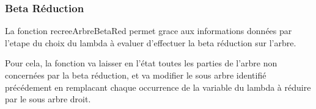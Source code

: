 \documentclass[a4paper,11pt,titlepage]{article}
\begin{document}
\subsubsection{Beta Réduction}

  La fonction recreeArbreBetaRed permet grace aux informations données par l'etape du choix du lambda à evaluer d'effectuer la
beta réduction sur l'arbre.

  Pour cela, la fonction va laisser en l'état toutes les parties de l'arbre non concernées par la beta réduction, et va modifier
le sous arbre identifié précédement en remplacant chaque occurrence de la variable du lambda à réduire par le sous arbre
droit.
\end{document}
